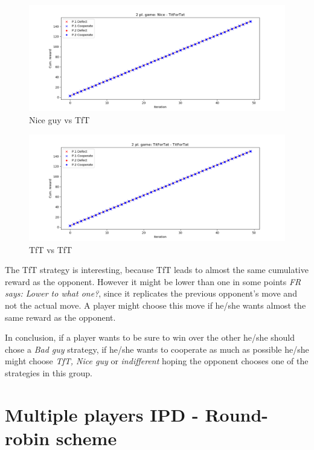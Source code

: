 \documentclass[journal,a4paper,10pt,twoside]{IEEEtran}
\newcommand{\FR}[1]{\textit{\color{ForestGreen}FR says: #1}}
\begin{document}
\begin{figure}[ht]
    \centering
    \includegraphics[width=1\columnwidth]{../img/ipd2p-rewards-Nice-TitForTat.png}
    \caption{Nice guy vs TfT}
    \label{fig:nicevstft}
\end{figure}

\begin{figure}[ht]
    \centering
    \includegraphics[width=1\columnwidth]{../img/ipd2p-rewards-TitForTat-TitForTat.png}
    \caption{TfT vs TfT}
    \label{fig:tftvstft}
\end{figure}

The TfT strategy is interesting, because TfT leads to almost the same cumulative reward as the opponent.
However it might be lower than one in some points \FR{Lower to \emph{what} one?}, since it replicates the previous opponent's move and not the actual move.
A player might choose this move if he/she wants almost the same reward as the opponent.

In conclusion, if a player wants to be sure to win over the other he/she should chose a \textit{Bad guy} strategy, if he/she wants to cooperate as much as possible he/she might choose \textit{TfT, Nice guy} or \textit{indifferent} hoping the opponent chooses one of the strategies in this group.     

\section{Multiple players IPD - Round-robin scheme} \label{s:IPDMP}
\end{document}
